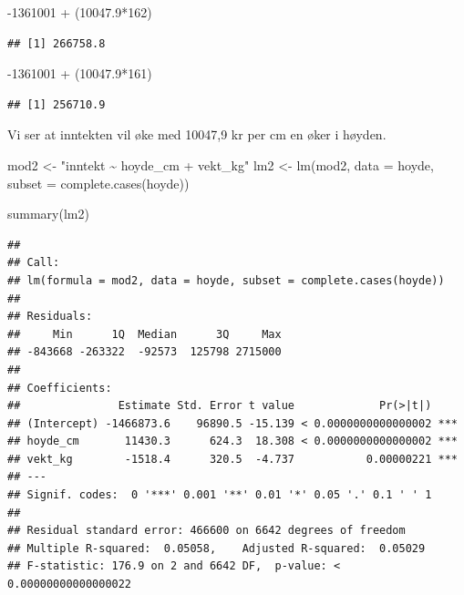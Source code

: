\documentclass[
  12pt,
  norsk,
]{article}
\newenvironment{Shaded}{\begin{snugshade}}{\end{snugshade}}
\newcommand{\AttributeTok}[1]{\textcolor[rgb]{0.77,0.63,0.00}{#1}}
\newcommand{\DecValTok}[1]{\textcolor[rgb]{0.00,0.00,0.81}{#1}}
\newcommand{\FloatTok}[1]{\textcolor[rgb]{0.00,0.00,0.81}{#1}}
\newcommand{\FunctionTok}[1]{\textcolor[rgb]{0.00,0.00,0.00}{#1}}
\newcommand{\NormalTok}[1]{#1}
\newcommand{\OtherTok}[1]{\textcolor[rgb]{0.56,0.35,0.01}{#1}}
\newcommand{\SpecialCharTok}[1]{\textcolor[rgb]{0.00,0.00,0.00}{#1}}
\newcommand{\StringTok}[1]{\textcolor[rgb]{0.31,0.60,0.02}{#1}}
\begin{document}
\begin{Shaded}
\begin{Highlighting}[]
\SpecialCharTok{{-}}\DecValTok{1361001} \SpecialCharTok{+}\NormalTok{ (}\FloatTok{10047.9}\SpecialCharTok{*}\DecValTok{162}\NormalTok{)}
\end{Highlighting}
\end{Shaded}

\begin{verbatim}
## [1] 266758.8
\end{verbatim}

\begin{Shaded}
\begin{Highlighting}[]
\SpecialCharTok{{-}}\DecValTok{1361001} \SpecialCharTok{+}\NormalTok{ (}\FloatTok{10047.9}\SpecialCharTok{*}\DecValTok{161}\NormalTok{)}
\end{Highlighting}
\end{Shaded}

\begin{verbatim}
## [1] 256710.9
\end{verbatim}

Vi ser at inntekten vil øke med 10047,9 kr per cm en øker i høyden.

\begin{Shaded}
\begin{Highlighting}[]
\NormalTok{mod2 }\OtherTok{\textless{}{-}} \StringTok{"inntekt \textasciitilde{} hoyde\_cm + vekt\_kg"}
\NormalTok{lm2 }\OtherTok{\textless{}{-}} \FunctionTok{lm}\NormalTok{(mod2, }\AttributeTok{data =}\NormalTok{ hoyde, }\AttributeTok{subset =} \FunctionTok{complete.cases}\NormalTok{(hoyde))}
\end{Highlighting}
\end{Shaded}

\begin{Shaded}
\begin{Highlighting}[]
\FunctionTok{summary}\NormalTok{(lm2)}
\end{Highlighting}
\end{Shaded}

\begin{verbatim}
## 
## Call:
## lm(formula = mod2, data = hoyde, subset = complete.cases(hoyde))
## 
## Residuals:
##     Min      1Q  Median      3Q     Max 
## -843668 -263322  -92573  125798 2715000 
## 
## Coefficients:
##               Estimate Std. Error t value             Pr(>|t|)    
## (Intercept) -1466873.6    96890.5 -15.139 < 0.0000000000000002 ***
## hoyde_cm       11430.3      624.3  18.308 < 0.0000000000000002 ***
## vekt_kg        -1518.4      320.5  -4.737           0.00000221 ***
## ---
## Signif. codes:  0 '***' 0.001 '**' 0.01 '*' 0.05 '.' 0.1 ' ' 1
## 
## Residual standard error: 466600 on 6642 degrees of freedom
## Multiple R-squared:  0.05058,    Adjusted R-squared:  0.05029 
## F-statistic: 176.9 on 2 and 6642 DF,  p-value: < 0.00000000000000022
\end{verbatim}
\end{document}
